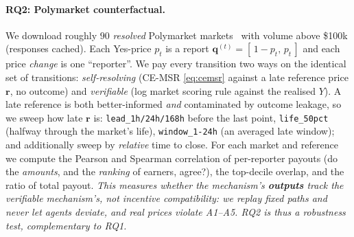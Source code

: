 \paragraph{RQ2: Polymarket counterfactual.}
We download roughly $90$ \emph{resolved} Polymarket markets~\parencite{polymarket} with
volume above \$100k (responses cached). Each Yes-price $p_t$ is a report
$\mathbf{q}^{(t)}=[\,1-p_t,\,p_t\,]$ and each price \emph{change} is one ``reporter''. We
pay every transition two ways on the identical set of transitions: \emph{self-resolving}
(CE-MSR \eqref{eq:cemsr} against a late reference price $\mathbf{r}$, no outcome) and
\emph{verifiable} (log market scoring rule against the realised $Y$). A late reference is
both better-informed \emph{and} contaminated by outcome leakage, so we sweep how late
$\mathbf{r}$ is: \texttt{lead\_1h/24h/168h} before the last point, \texttt{life\_50pct}
(halfway through the market's life), \texttt{window\_1-24h} (an averaged late window);
and additionally sweep by \emph{relative} time to close. For each market and reference we
compute the Pearson and Spearman correlation of per-reporter payouts (do the \emph{amounts},
and the \emph{ranking} of earners, agree?), the top-decile overlap, and the ratio of total
payout. \emph{This measures whether the mechanism's \textbf{outputs} track the verifiable
mechanism's, not incentive compatibility: we replay fixed paths and never let agents
deviate, and real prices violate A1--A5. RQ2 is thus a robustness test, complementary to
RQ1.}

